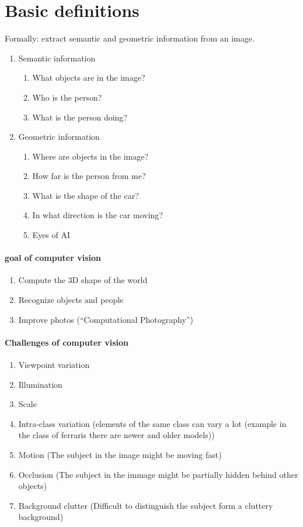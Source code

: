 \section{Basic definitions}
Formally: extract semantic
and geometric information
from an image.


\begin{enumerate}
    \item Semantic information
          \begin{enumerate}
              \item What objects are in the image?
              \item Who is the person?
              \item What is the person doing?
          \end{enumerate}
    \item Geometric information
          \begin{enumerate}
              \item Where are objects in the image?
              \item How far is the person from me?
              \item What is the shape of the car?
              \item In what direction is the car moving?
              \item Eyes of AI
          \end{enumerate}
\end{enumerate}


\paragraph*{goal of computer vision}
\begin{enumerate}
    \item Compute the 3D shape of the world
    \item Recognize objects and people
    \item Improve photos (“Computational Photography”)
\end{enumerate}


\paragraph*{Challenges of computer vision}
\begin{enumerate}
    \item Viewpoint variation
    \item Illumination
    \item Scale
    \item Intra-class variation (elements of the same class can vary a lot (example in the class of ferraris there are newer and older models))
    \item Motion (The subject in the image might be moving fast)
    \item Occlusion (The subject in the immage might be partially hidden behind other objects)
    \item Background clutter (Difficult to distinguish the subject form a cluttery background)
\end{enumerate}

